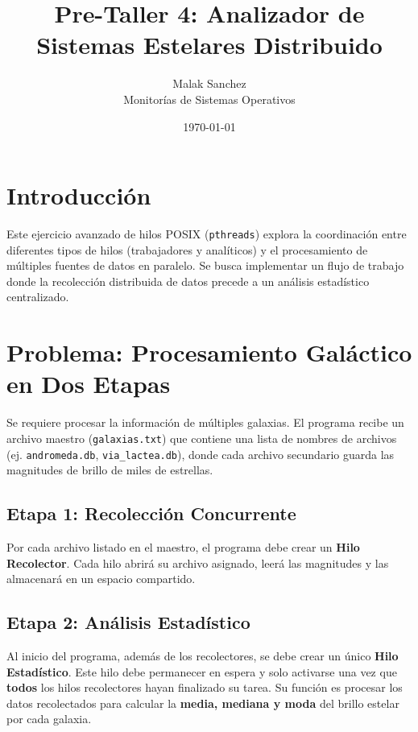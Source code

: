 \documentclass[12pt,a4paper]{article}
\title{\textbf{Pre-Taller 4: Analizador de Sistemas Estelares Distribuido}}
\author{Malak Sanchez \\ \small Monitorías de Sistemas Operativos}
\date{\today}
\begin{document}
\maketitle

\section*{Introducción}
Este ejercicio avanzado de hilos POSIX (\texttt{pthreads}) explora la coordinación entre diferentes tipos de hilos (trabajadores y analíticos) y el procesamiento de múltiples fuentes de datos en paralelo. Se busca implementar un flujo de trabajo donde la recolección distribuida de datos precede a un análisis estadístico centralizado.

\section*{Problema: Procesamiento Galáctico en Dos Etapas}
Se requiere procesar la información de múltiples galaxias. El programa recibe un archivo maestro (\texttt{galaxias.txt}) que contiene una lista de nombres de archivos (ej. \texttt{andromeda.db}, \texttt{via\_lactea.db}), donde cada archivo secundario guarda las magnitudes de brillo de miles de estrellas.

\subsection*{Etapa 1: Recolección Concurrente}
Por cada archivo listado en el maestro, el programa debe crear un \textbf{Hilo Recolector}. Cada hilo abrirá su archivo asignado, leerá las magnitudes y las almacenará en un espacio compartido.

\subsection*{Etapa 2: Análisis Estadístico}
Al inicio del programa, además de los recolectores, se debe crear un único \textbf{Hilo Estadístico}. Este hilo debe permanecer en espera y solo activarse una vez que \textbf{todos} los hilos recolectores hayan finalizado su tarea. Su función es procesar los datos recolectados para calcular la \textbf{media, mediana y moda} del brillo estelar por cada galaxia.
\end{document}
